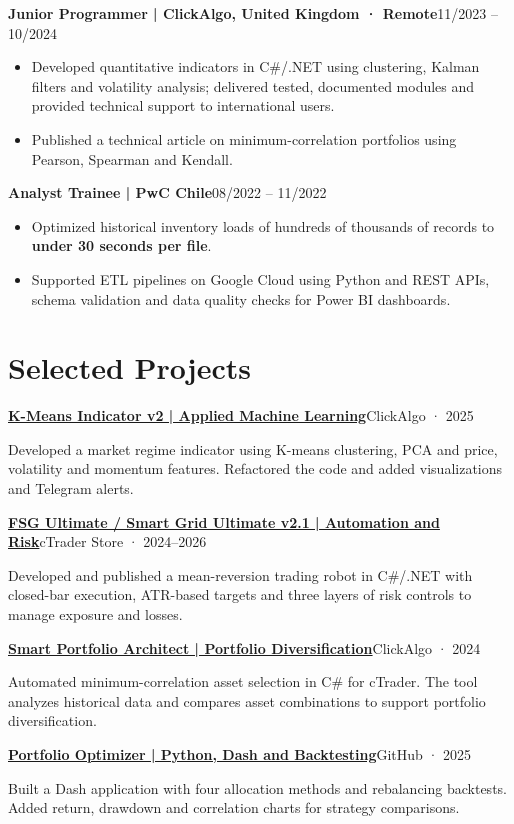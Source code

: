 \documentclass[10pt,a4paper]{article}
\newcommand{\entry}[2]{\par\addvspace{3pt}\textbf{#1}\hfill{\fontsize{9.5}{11}\selectfont\color{muted}#2}\par\nopagebreak}
\newcommand{\project}[3]{\par\addvspace{3pt}\textbf{\href{#1}{#2}}\hfill{\fontsize{9.5}{11}\selectfont\color{muted}#3}\par\nopagebreak}
\begin{document}
\entry{Junior Programmer | ClickAlgo, United Kingdom · Remote}{11/2023 -- 10/2024}
\begin{itemize}
  \item Developed quantitative indicators in C\#/.NET using clustering, Kalman filters and volatility analysis;
  delivered tested, documented modules and provided technical support to international users.
  \item Published a technical article on minimum-correlation portfolios using Pearson, Spearman and Kendall.
\end{itemize}

\entry{Analyst Trainee | PwC Chile}{08/2022 -- 11/2022}
\begin{itemize}
  \item Optimized historical inventory loads of hundreds of thousands of records to
  \textbf{under 30 seconds per file}.
  \item Supported ETL pipelines on Google Cloud using Python and REST APIs, schema validation and
  data quality checks for Power BI dashboards.
\end{itemize}

\section{Selected Projects}
\project{https://clickalgo.com/k-means}{K-Means Indicator v2 | Applied Machine Learning}{ClickAlgo · 2025}
Developed a market regime indicator using K-means clustering, PCA and price, volatility and momentum
features. Refactored the code and added visualizations and Telegram alerts.

\project{https://ctrader.com/products/438}{FSG Ultimate / Smart Grid Ultimate v2.1 | Automation and Risk}{cTrader Store · 2024--2026}
Developed and published a mean-reversion trading robot in C\#/.NET with closed-bar execution, ATR-based
targets and three layers of risk controls to manage exposure and losses.

\project{https://clickalgo.com/smart-portfolio-architect}{Smart Portfolio Architect | Portfolio Diversification}{ClickAlgo · 2024}
Automated minimum-correlation asset selection in C\# for cTrader. The tool analyzes historical data
and compares asset combinations to support portfolio diversification.

\project{https://github.com/walterm2482/portfolio-optimizer}{Portfolio Optimizer | Python, Dash and Backtesting}{GitHub · 2025}
Built a Dash application with four allocation methods and rebalancing backtests. Added return,
drawdown and correlation charts for strategy comparisons.
\end{document}
